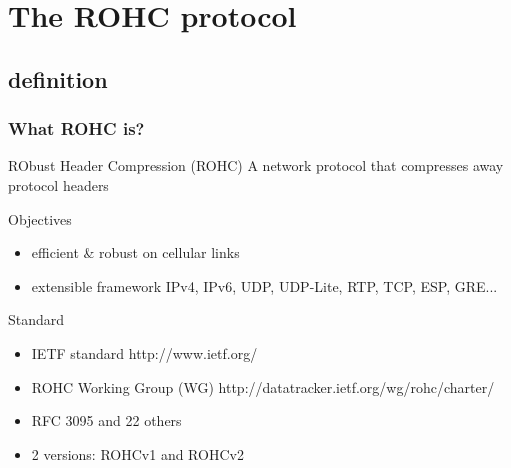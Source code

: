\documentclass[utf8]{beamer}
\begin{document}


\section{The ROHC protocol}

\subsection{definition}
\begin{frame}
	\frametitle{What ROHC is?}
	\begin{block}{RObust Header Compression (ROHC)}
		A network protocol that compresses away protocol headers
	\end{block}
	\pause
	\begin{block}{Objectives}
		\begin{itemize}
			\item efficient \& robust on cellular links
			\item extensible framework {\tiny IPv4, IPv6, UDP, UDP-Lite, RTP, TCP, ESP, GRE...}
		\end{itemize}
	\end{block}
	\pause
	\begin{block}{Standard}
		\begin{itemize}
			\item IETF standard {\tiny http://www.ietf.org/}
			\item ROHC Working Group (WG) {\tiny http://datatracker.ietf.org/wg/rohc/charter/}
			\item RFC 3095 and 22 others
			\item 2 versions: ROHCv1 and ROHCv2
		\end{itemize}
	\end{block}
\end{frame}
\end{document}

